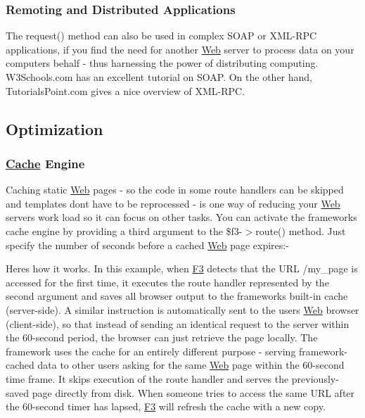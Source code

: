 \subsubsection*{Remoting and Distributed Applications}

The {\ttfamily request()} method can also be used in complex S\+O\+AP or X\+M\+L-\/\+R\+PC applications, if you find the need for another \hyperlink{class_web}{Web} server to process data on your computer\textquotesingle{}s behalf -\/ thus harnessing the power of distributing computing. W3\+Schools.\+com has an excellent tutorial on S\+O\+AP. On the other hand, Tutorials\+Point.\+com gives a nice overview of X\+M\+L-\/\+R\+PC.

\subsection*{Optimization}

\subsubsection*{\hyperlink{class_cache}{Cache} Engine}

Caching static \hyperlink{class_web}{Web} pages -\/ so the code in some route handlers can be skipped and templates don\textquotesingle{}t have to be reprocessed -\/ is one way of reducing your \hyperlink{class_web}{Web} server\textquotesingle{}s work load so it can focus on other tasks. You can activate the framework\textquotesingle{}s cache engine by providing a third argument to the {\ttfamily \$f3-\/$>$route()} method. Just specify the number of seconds before a cached \hyperlink{class_web}{Web} page expires\+:-\/




Here\textquotesingle{}s how it works. In this example, when \hyperlink{class_f3}{F3} detects that the U\+RL {\ttfamily /my\+\_\+page} is accessed for the first time, it executes the route handler represented by the second argument and saves all browser output to the framework\textquotesingle{}s built-\/in cache (server-\/side). A similar instruction is automatically sent to the user\textquotesingle{}s \hyperlink{class_web}{Web} browser (client-\/side), so that instead of sending an identical request to the server within the 60-\/second period, the browser can just retrieve the page locally. The framework uses the cache for an entirely different purpose -\/ serving framework-\/cached data to other users asking for the same \hyperlink{class_web}{Web} page within the 60-\/second time frame. It skips execution of the route handler and serves the previously-\/saved page directly from disk. When someone tries to access the same U\+RL after the 60-\/second timer has lapsed, \hyperlink{class_f3}{F3} will refresh the cache with a new copy.

